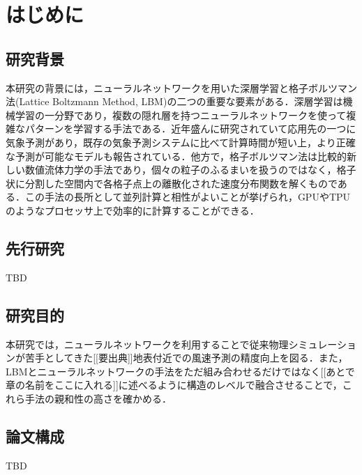 \chapter{はじめに}

\section{研究背景}
本研究の背景には，ニューラルネットワークを用いた深層学習と格子ボルツマン法(Lattice Boltzmann Method, LBM)の二つの重要な要素がある．深層学習は機械学習の一分野であり，複数の隠れ層を持つニューラルネットワークを使って複雑なパターンを学習する手法である．近年盛んに研究されていて応用先の一つに気象予測があり\cite{Schultz2021}，既存の気象予測システムに比べて計算時間が短い上，より正確な予測が可能なモデルも報告されている\cite{Google2023}．他方で，格子ボルツマン法は比較的新しい数値流体力学の手法であり，個々の粒子のふるまいを扱うのではなく，格子状に分割した空間内で各格子点上の離散化された速度分布関数を解くものである\cite{doi:10.1146/annurev.fluid.30.1.329}．この手法の長所として並列計算と相性がよいことが挙げられ，GPUやTPUのようなプロセッサ上で効率的に計算することができる．

\section{先行研究}
TBD

\section{研究目的}
本研究では，ニューラルネットワークを利用することで従来物理シミュレーションが苦手としてきた[[要出典]]地表付近での風速予測の精度向上を図る．また，LBMとニューラルネットワークの手法をただ組み合わせるだけではなく[[あとで章の名前をここに入れる]]に述べるように構造のレベルで融合させることで，これら手法の親和性の高さを確かめる．

\section{論文構成}
TBD 
